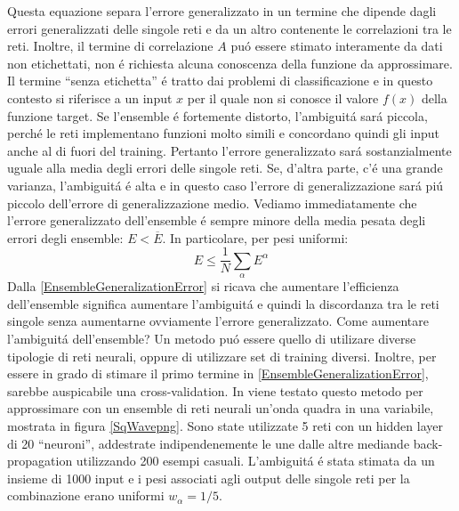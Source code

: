 \documentclass[a4paper,12pt]{report}
\begin{document}
  Questa equazione separa l'errore generalizzato in un termine che dipende dagli errori generalizzati delle singole reti e da un altro contenente le correlazioni tra le reti. 
  Inoltre, il termine di correlazione $A$ pu\'o essere stimato interamente da dati non etichettati, non \'e richiesta alcuna conoscenza della funzione da approssimare. 
  Il termine ``senza etichetta'' \'e tratto dai problemi di classificazione e in questo contesto si riferisce a un input $x$ per il quale non si conosce il valore $f(x)$ della funzione target. 
  Se l'ensemble \'e fortemente distorto, l'ambiguit\'a sar\'a piccola, perch\'e le reti implementano funzioni molto simili e concordano quindi gli input anche al di fuori del training. 
  Pertanto l'errore generalizzato sar\'a sostanzialmente uguale alla media degli errori delle singole reti. 
  Se, d'altra parte, c'\'e una grande varianza, l'ambiguit\'a \'e alta e in questo caso l'errore di generalizzazione sar\'a pi\'u piccolo dell'errore di generalizzazione medio.
  Vediamo immediatamente che l'errore generalizzato dell'ensemble \'e sempre minore della media pesata degli errori degli ensemble: $E < \overline{E}$. In particolare, per pesi uniformi:
  \begin{equation}
   E \le \frac{1}{N} \sum_{\alpha} E^{\alpha}
  \end{equation}
  Dalla \ref{EnsembleGeneralizationError} si ricava che aumentare l'efficienza dell'ensemble significa aumentare l'ambiguit\'a e quindi la discordanza tra le reti singole senza aumentarne ovviamente l'errore generalizzato. 
  Come aumentare l'ambiguit\'a dell'ensemble? Un metodo pu\'o essere quello di utilizare diverse tipologie di reti neurali, oppure di utilizzare set di training diversi. 
  Inoltre, per essere in grado di stimare il primo termine in \ref{EnsembleGeneralizationError}, sarebbe auspicabile una cross-validation. 
  In \cite{krogh1995neural} viene testato questo metodo per approssimare con un ensemble di reti neurali un'onda quadra in una variabile, mostrata in figura \ref{SqWavepng}. 
  Sono state utilizzate 5 reti con un hidden layer di 20 ``neuroni'', addestrate indipendenemente le une dalle altre mediande back-propagation utilizzando 200 esempi casuali. 
  L'ambiguit\'a \'e stata stimata da un insieme di 1000 input e i pesi associati agli output delle singole reti per la combinazione erano uniformi $w_{\alpha} = 1/5$.
\end{document}
